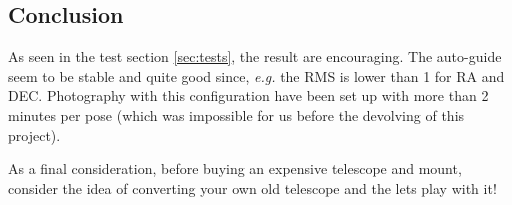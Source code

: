 \documentclass{article}
\begin{document}
\begin{multicols}{2}
        \section{Conclusion}
        As seen in the test section \ref{sec:tests}, the result are encouraging.
        The auto-guide seem to be stable and quite good since, \textit{e.g.} the RMS is lower than 1 for RA and DEC.
        Photography with this configuration have been set up with more than 2 minutes per pose (which was impossible for us before the devolving of this project).

        As a final consideration, before buying an expensive telescope and mount, consider the idea of converting your own old telescope and the lets play with it! 

    \end{multicols}
\end{document}
